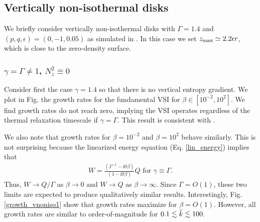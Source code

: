 
\subsection{Vertically non-isothermal disks}
We briefly consider vertically non-isothermal disks with
$\Gamma=1.4$ and $(p,q,\epsilon)=(0,-1,0.05)$ as simulated in
\cite{nelson13}. In this case we set $z_\mathrm{max}\simeq2.2\epsilon r$, which
is close to the zero-density surface.     

\subsubsection{$\gamma=\Gamma \neq 1$, $N_z^2\equiv 0$}
Consider first the case $\gamma=1.4$ so that there is no vertical
entropy gradient. We plot in Fig. the growth rates for the
fundamental VSI for $\beta\in[10^{-2},10^{2}]$. We find growth rates
do not reach zero, implying the VSI operates regardless of the thermal
relaxation timescale if $\gamma=\Gamma$. This result is consistent
with \cite{nelson13}.  

We also note that growth rates for $\beta = 10^{-2}$ and
$\beta=10^{2}$ behave similarly. This is not surprising because
the linearized energy equation (Eq. \ref{lin_energy}) implies that 
\begin{align}
  W = \frac{\left(\Gamma^{-1} -
      \ii\hat{\sigma}\beta\right)}{\left(1-\ii\hat{\sigma}\beta\right)}
  Q \text{ for } \gamma\equiv \Gamma.   
\end{align}
Thus, $W \to Q/\Gamma$ as $\beta\to0$ and $W\to Q$ as
$\beta\to\infty$. Since $\Gamma=O(1)$, these two limits are expected
to produce qualitatively similar results. Interestingly,
Fig. \ref{growth_vnoniso1} show that growth rates 
maximize for $\beta=O(1)$. However, all growth rates are similar to
order-of-magnitude for $0.1\lesssim\hat{k}\lesssim 100$. 

